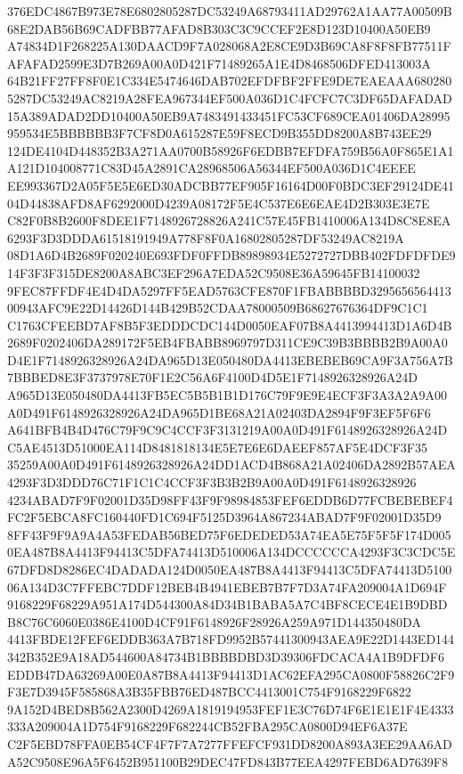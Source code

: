 \documentclass[UTF8,fontset=fandol,zihao=-4,a4paper]{ctexart}
\begin{document}
{{376EDC4867B973E78E6802805287DC53249A68793411AD29762A1AA77A00509B68E2DAB56B69CADFBB77AFAD8B303C3C9CCEF2E8D123D10400A50EB9
A74834D1F268225A130DAACD9F7A028068A2E8CE9D3B69CA8F8F8FB77511FAFAFAD2599E3D7B269A00A0D421F71489265A1E4D8468506DFED413003A
64B21FF27FF8F0E1C334E5474646DAB702EFDFBF2FFE9DE7EAEAAA6802805287DC53249AC8219A28FEA967344EF500A036D1C4FCFC7C3DF65DAFADAD
15A389ADAD2DD10400A50EB9A7483491433451FC53CF689CEA01406DA28995959534E5BBBBBB3F7CF8D0A615287E59F8ECD9B355DD8200A8B743EE29
124DE4104D448352B3A271AA0700B58926F6EDBB7EFDFA759B56A0F865E1A1A121D104008771C83D45A2891CA28968506A56344EF500A036D1C4EEEE
EE993367D2A05F5E5E6ED30ADCBB77EF905F16164D00F0BDC3EF29124DE4104D44838AFD8AF6292000D4239A08172F5E4C537E6E6EAE4D2B303E3E7E
C82F0B8B2600F8DEE1F7148926728826A241C57E45FB1410006A134D8C8E8EA6293F3D3DDDA61518191949A778F8F0A16802805287DF53249AC8219A
08D1A6D4B2689F020240E693FDF0FFDB89898934E5272727DBB402FDFDFDE914F3F3F315DE8200A8ABC3EF296A7EDA52C9508E36A59645FB14100032
9FEC87FFDF4E4D4DA5297FF5EAD5763CFE870F1FBABBBBD329565656441300943AFC9E22D14426D144B429B52CDAA78000509B68627676364DF9C1C1
C1763CFEEBD7AF8B5F3EDDDCDC144D0050EAF07B8A4413994413D1A6D4B2689F0202406DA289172F5EB4FBABB8969797D311CE9C39B3BBBB2B9A00A0
D4E1F7148926328926A24DA965D13E050480DA4413EBEBEB69CA9F3A756A7B7BBBED8E3F3737978E70F1E2C56A6F4100D4D5E1F7148926328926A24D
A965D13E050480DA4413FB5EC5B5B1B1D176C79F9E9E4ECF3F3A3A2A9A00A0D491F6148926328926A24DA965D1BE68A21A02403DA2894F9F3EF5F6F6
A641BFB4B4D476C79F9C9C4CCF3F3131219A00A0D491F6148926328926A24DC5AE4513D51000EA114D8481818134E5E7E6E6DAEEF857AF5E4DCF3F35
35259A00A0D491F6148926328926A24DD1ACD4B868A21A02406DA2892B57AEA4293F3D3DDD76C71F1C1C4CCF3F3B3B2B9A00A0D491F6148926328926
4234ABAD7F9F02001D35D98FF43F9F98984853FEF6EDDB6D77FCBEBEBEF4FC2F5EBCA8FC160440FD1C694F5125D3964A867234ABAD7F9F02001D35D9
8FF43F9F9A9A4A53FEDAB56BED75F6EDEDED53A74EA5E75F5F5F174D0050EA487B8A4413F94413C5DFA74413D510006A134DCCCCCCA4293F3C3CDC5E
67DFD8D8286EC4DADADA124D0050EA487B8A4413F94413C5DFA74413D510006A134D3C7FFEBC7DDF12BEB4B4941EBEB7B7F7D3A74FA209004A1D694F
9168229F68229A951A174D544300A84D34B1BABA5A7C4BF8CECE4E1B9DBDB8C76C6060E0386E4100D4CF91F6148926F28926A259A971D144350480DA
4413FBDE12FEF6EDDB363A7B718FD9952B57441300943AEA9E22D1443ED144342B352E9A18AD544600A84734B1BBBBDBD3D39306FDCACA4A1B9DFDF6
EDDB47DA63269A00E0A87B8A4413F94413D1AC62EFA295CA0800F58826C2F9F3E7D3945F585868A3B35FBB76ED487BCC4413001C754F9168229F6822
9A152D4BED8B562A2300D4269A1819194953FEF1E3C76D74F6E1E1E1F4E4333333A209004A1D754F9168229F682244CB52FBA295CA0800D94EF6A37E
C2F5EBD78FFA0EB54CF4F7F7A7277FFEFCF931DD8200A893A3EE29AA6ADA52C9508E96A5F6452B951100B29DEC47FD843B77EEA4297FEBD6AD7639F8
}}
\end{document}
